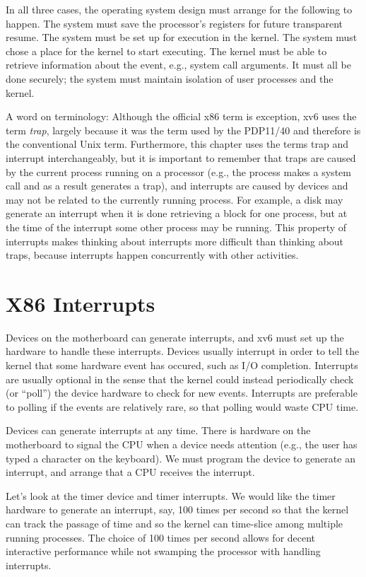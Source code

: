 In all three cases, the operating system design must arrange for the
following to happen.  The system must save the processor's registers for future
transparent resume.  The system must be set up for execution
in the kernel.  The system must chose a place for the kernel to start
executing. The kernel must be able to retrieve information about the
event, e.g., system call arguments.  It must all be done securely; the system
must maintain isolation of user processes and the kernel.

A word on terminology: Although the official x86 term is exception,
xv6 uses the term
\textit{trap}, 
largely because it was the term
used by the PDP11/40 and therefore is the conventional Unix term.
Furthermore, this chapter uses the terms trap and interrupt interchangeably, but it
is important to remember that traps are caused by the current process
running on a processor (e.g., the process makes a system call and as a
result generates a trap), and interrupts are caused by devices and may
not be related to the currently running process.
For example, a disk may generate an interrupt when
it is done retrieving a block for one process, but
at the time of the interrupt some other process may be running.
This
property of interrupts makes thinking about interrupts more difficult
than thinking about traps, because interrupts happen
concurrently with other activities.
\section{X86 Interrupts}

Devices on the motherboard can generate interrupts, and xv6 must set up
the hardware to handle these interrupts.
Devices usually interrupt in order to tell the kernel that some hardware
event has occured, such as I/O completion.
Interrupts are usually optional in the sense that the kernel could
instead periodically check (or ``poll'') the device hardware to check
for new events.
Interrupts are preferable to polling if the events are relatively
rare, so that polling would waste CPU time.

Devices can generate interrupts
at any time.  There is hardware on the motherboard to signal the CPU
when a device needs attention (e.g., the user has typed a character on
the keyboard). We must program the device to generate an interrupt, and
arrange that a CPU receives the interrupt. 

Let's look at the timer device and timer interrupts.  We would like
the timer hardware to generate an interrupt, say, 100 times per
second so that the kernel can track the passage of time and so the
kernel can time-slice among multiple running processes.  The choice of
100 times per second allows for decent interactive performance while
not swamping the processor with handling interrupts.  

